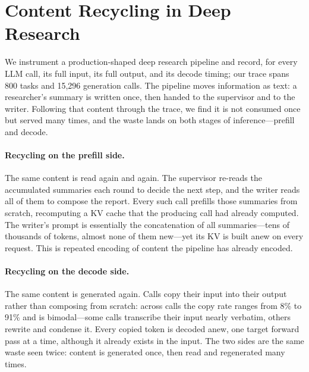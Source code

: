 \section{Content Recycling in Deep Research}
\label{sec:characterization}

We instrument a production-shaped deep research pipeline and record, for every LLM call, its full input, its full output, and its decode timing; our trace spans 800 tasks and 15{,}296 generation calls. The pipeline moves information as text: a researcher's summary is written once, then handed to the supervisor and to the writer. Following that content through the trace, we find it is not consumed once but served many times, and the waste lands on both stages of inference---prefill and decode.

\paragraph{Recycling on the prefill side.}
The same content is read again and again. The supervisor re-reads the accumulated summaries each round to decide the next step, and the writer reads all of them to compose the report. Every such call prefills those summaries from scratch, recomputing a KV cache that the producing call had already computed. The writer's prompt is essentially the concatenation of all summaries---tens of thousands of tokens, almost none of them new---yet its KV is built anew on every request. This is repeated encoding of content the pipeline has already encoded.

\paragraph{Recycling on the decode side.}
The same content is generated again. Calls copy their input into their output rather than composing from scratch: across calls the copy rate ranges from 8\% to 91\% and is bimodal---some calls transcribe their input nearly verbatim, others rewrite and condense it. Every copied token is decoded anew, one target forward pass at a time, although it already exists in the input. The two sides are the same waste seen twice: content is generated once, then read and regenerated many times.
